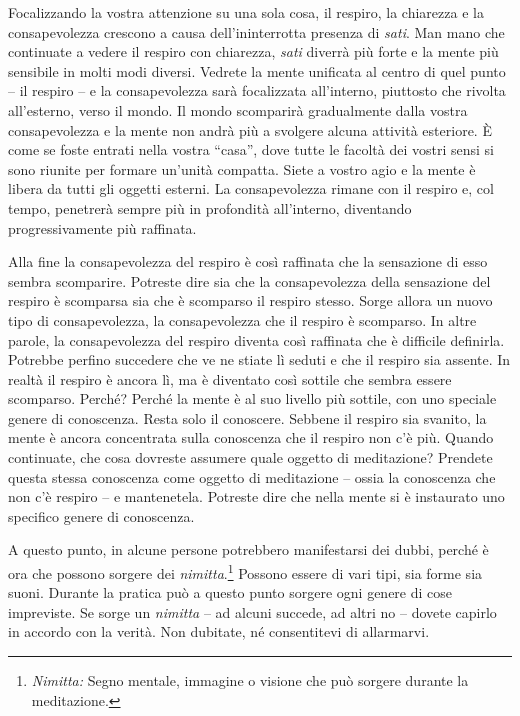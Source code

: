 Focalizzando la vostra attenzione su una sola cosa, il respiro, la
chiarezza e la consapevolezza crescono a causa dell'ininterrotta
presenza di \emph{sati}. Man mano che continuate a vedere il respiro con
chiarezza, \emph{sati} diverrà più forte e la mente più sensibile in
molti modi diversi. Vedrete la mente unificata al centro di quel punto
-- il respiro -- e la consapevolezza sarà focalizzata all'interno,
piuttosto che rivolta all'esterno, verso il mondo. Il mondo scomparirà
gradualmente dalla vostra consapevolezza e la mente non andrà più a
svolgere alcuna attività esteriore. È come se foste entrati nella vostra
``casa'', dove tutte le facoltà dei vostri sensi si sono riunite per
formare un'unità compatta. Siete a vostro agio e la mente è libera da
tutti gli oggetti esterni. La consapevolezza rimane con il respiro e,
col tempo, penetrerà sempre più in profondità all'interno, diventando
progressivamente più raffinata.

Alla fine la consapevolezza del respiro è così raffinata che la
sensazione di esso sembra scomparire. Potreste dire sia che la
consapevolezza della sensazione del respiro è scomparsa sia che è
scomparso il respiro stesso. Sorge allora un nuovo tipo di
consapevolezza, la consapevolezza che il respiro è scomparso. In altre
parole, la consapevolezza del respiro diventa così raffinata che è
difficile definirla. Potrebbe perfino succedere che ve ne stiate lì
seduti e che il respiro sia assente. In realtà il respiro è ancora lì,
ma è diventato così sottile che sembra essere scomparso. Perché? Perché
la mente è al suo livello più sottile, con uno speciale genere di
conoscenza. Resta solo il conoscere. Sebbene il respiro sia svanito, la
mente è ancora concentrata sulla conoscenza che il respiro non c'è più.
Quando continuate, che cosa dovreste assumere quale oggetto di
meditazione? Prendete questa stessa conoscenza come oggetto di
meditazione -- ossia la conoscenza che non c'è respiro -- e mantenetela.
Potreste dire che nella mente si è instaurato uno specifico genere di
conoscenza.

A questo punto, in alcune persone potrebbero manifestarsi dei dubbi,
perché è ora che possono sorgere dei \emph{nimitta}.\footnote{%
  \emph{Nimitta:}
  Segno mentale, immagine o visione che può sorgere durante la
  meditazione.} Possono essere di vari tipi, sia forme sia suoni.
Durante la pratica può a questo punto sorgere ogni genere di cose
impreviste. Se sorge un \emph{nimitta} -- ad alcuni succede, ad altri no
-- dovete capirlo in accordo con la verità. Non dubitate, né
consentitevi di allarmarvi.

